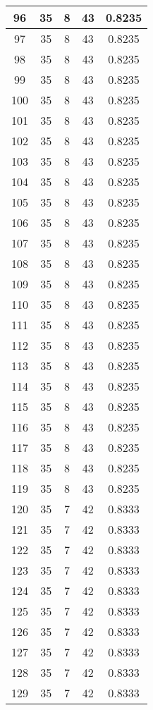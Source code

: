 \documentclass[letterpaper, 12pt]{article}
\begin{document}
\begin{longtable}{|c|c|c|c|c|}
\hline
96 & 35 & 8 & 43 & 0.8235 \\
\hline
97 & 35 & 8 & 43 & 0.8235 \\
\hline
98 & 35 & 8 & 43 & 0.8235 \\
\hline
99 & 35 & 8 & 43 & 0.8235 \\
\hline
100 & 35 & 8 & 43 & 0.8235 \\
\hline
101 & 35 & 8 & 43 & 0.8235 \\
\hline
102 & 35 & 8 & 43 & 0.8235 \\
\hline
103 & 35 & 8 & 43 & 0.8235 \\
\hline
104 & 35 & 8 & 43 & 0.8235 \\
\hline
105 & 35 & 8 & 43 & 0.8235 \\
\hline
106 & 35 & 8 & 43 & 0.8235 \\
\hline
107 & 35 & 8 & 43 & 0.8235 \\
\hline
108 & 35 & 8 & 43 & 0.8235 \\
\hline
109 & 35 & 8 & 43 & 0.8235 \\
\hline
110 & 35 & 8 & 43 & 0.8235 \\
\hline
111 & 35 & 8 & 43 & 0.8235 \\
\hline
112 & 35 & 8 & 43 & 0.8235 \\
\hline
113 & 35 & 8 & 43 & 0.8235 \\
\hline
114 & 35 & 8 & 43 & 0.8235 \\
\hline
115 & 35 & 8 & 43 & 0.8235 \\
\hline
116 & 35 & 8 & 43 & 0.8235 \\
\hline
117 & 35 & 8 & 43 & 0.8235 \\
\hline
118 & 35 & 8 & 43 & 0.8235 \\
\hline
119 & 35 & 8 & 43 & 0.8235 \\
\hline
120 & 35 & 7 & 42 & 0.8333 \\
\hline
121 & 35 & 7 & 42 & 0.8333 \\
\hline
122 & 35 & 7 & 42 & 0.8333 \\
\hline
123 & 35 & 7 & 42 & 0.8333 \\
\hline
124 & 35 & 7 & 42 & 0.8333 \\
\hline
125 & 35 & 7 & 42 & 0.8333 \\
\hline
126 & 35 & 7 & 42 & 0.8333 \\
\hline
127 & 35 & 7 & 42 & 0.8333 \\
\hline
128 & 35 & 7 & 42 & 0.8333 \\
\hline
129 & 35 & 7 & 42 & 0.8333 \\

\end{longtable}
\end{document}
